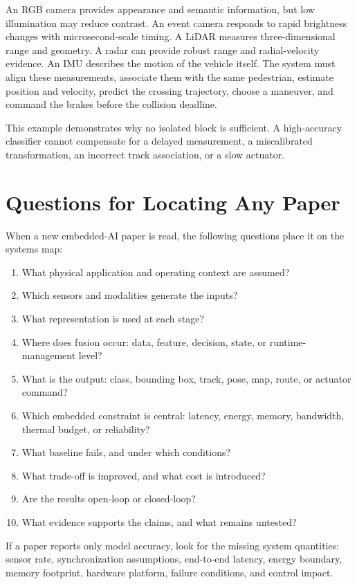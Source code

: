 An RGB camera provides appearance and semantic information, but low illumination may reduce contrast. An event camera responds to rapid brightness changes with microsecond-scale timing. A LiDAR measures three-dimensional range and geometry. A radar can provide robust range and radial-velocity evidence. An IMU describes the motion of the vehicle itself. The system must align these measurements, associate them with the same pedestrian, estimate position and velocity, predict the crossing trajectory, choose a maneuver, and command the brakes before the collision deadline.

This example demonstrates why no isolated block is sufficient. A high-accuracy classifier cannot compensate for a delayed measurement, a miscalibrated transformation, an incorrect track association, or a slow actuator.

\section{Questions for Locating Any Paper}

When a new embedded-AI paper is read, the following questions place it on the systems map:

\begin{enumerate}[label=\alph*)]
    \item What physical application and operating context are assumed?
    \item Which sensors and modalities generate the inputs?
    \item What representation is used at each stage?
    \item Where does fusion occur: data, feature, decision, state, or runtime-management level?
    \item What is the output: class, bounding box, track, pose, map, route, or actuator command?
    \item Which embedded constraint is central: latency, energy, memory, bandwidth, thermal budget, or reliability?
    \item What baseline fails, and under which conditions?
    \item What trade-off is improved, and what cost is introduced?
    \item Are the results open-loop or closed-loop?
    \item What evidence supports the claims, and what remains untested?
\end{enumerate}

\begin{engineeringcheck}
If a paper reports only model accuracy, look for the missing system quantities: sensor rate, synchronization assumptions, end-to-end latency, energy boundary, memory footprint, hardware platform, failure conditions, and control impact.
\end{engineeringcheck}

